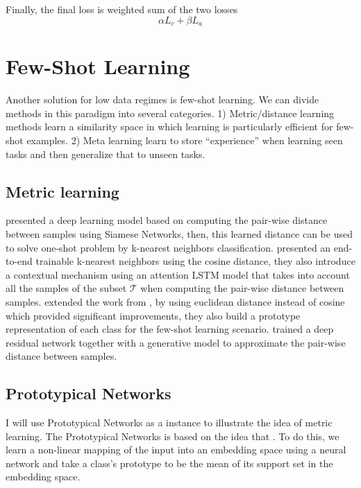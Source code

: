 \documentclass{article}
\begin{document}
Finally, the final loss is weighted sum of the two losses
\[
\alpha L_c+\beta L_a
\]

\section{Few-Shot Learning}

Another solution for low data regimes is few-shot learning. We can divide methods in this paradigm into several categories. 1) Metric/distance learning methods \cite{snell2017prototypical,sung2018learning,vinyals2016matching,koch2015siamese,mehrotra2017generative} learn a similarity space in which learning is particularly efficient for few-shot examples. 2) Meta learning \cite{munkhdalai2017meta,santoro2016meta,ravi2016optimization,finn2017model} learn to store “experience” when learning seen tasks and then generalize that to unseen tasks.

\subsection{Metric learning}

\cite{koch2015siamese} presented a deep learning model based on computing the pair-wise distance between samples using Siamese Networks, then, this learned distance can be used to solve one-shot problem by k-nearest neighbors classification. \cite{vinyals2016matching} presented an end-to-end trainable k-nearest neighbors using the cosine distance, they also introduce a contextual mechanism using an attention LSTM model \cite{hochreiter1997long} that takes into account all the samples of the subset $\mathcal{T}$ when computing the pair-wise distance between samples. \cite{snell2017prototypical} extended the work from \cite{vinyals2016matching}, by using euclidean distance instead of cosine which provided significant improvements, they also build a prototype representation of each class for the few-shot learning scenario. \cite{mehrotra2017generative} trained a deep residual network together with a generative model to approximate the pair-wise distance between samples.

\subsection*{Prototypical Networks}

I will use Prototypical Networks \cite{snell2017prototypical} as a instance to illustrate the idea of metric learning. The Prototypical Networks is based on the idea that {}. To do this, we learn a non-linear mapping of the input into an embedding space using a neural network and take a class's prototype to be the mean of its support set in the embedding space. 
\end{document}
